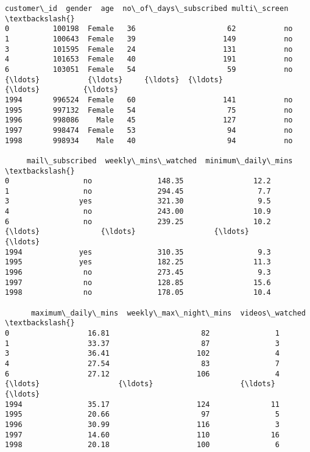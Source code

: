 \documentclass[11pt]{article}
\makeatletter
\newcommand{\boxspacing}{\kern\kvtcb@left@rule\kern\kvtcb@boxsep}
\newcommand{\prompt}[4]{
        {\ttfamily\llap{{\color{#2}[#3]:\hspace{3pt}#4}}\vspace{-\baselineskip}}
    }
\makeatother
\begin{document}
            \begin{tcolorbox}[breakable, size=fbox, boxrule=.5pt, pad at break*=1mm, opacityfill=0]
\prompt{Out}{outcolor}{52}{\boxspacing}
\begin{Verbatim}[commandchars=\\\{\}]
      customer\_id  gender  age  no\_of\_days\_subscribed multi\_screen  \textbackslash{}
0          100198  Female   36                     62           no
1          100643  Female   39                    149           no
3          101595  Female   24                    131           no
4          101653  Female   40                    191           no
6          103051  Female   54                     59           no
{\ldots}           {\ldots}     {\ldots}  {\ldots}                    {\ldots}          {\ldots}
1994       996524  Female   60                    141           no
1995       997132  Female   54                     75           no
1996       998086    Male   45                    127           no
1997       998474  Female   53                     94           no
1998       998934    Male   40                     94           no

     mail\_subscribed  weekly\_mins\_watched  minimum\_daily\_mins  \textbackslash{}
0                 no               148.35                12.2
1                 no               294.45                 7.7
3                yes               321.30                 9.5
4                 no               243.00                10.9
6                 no               239.25                10.2
{\ldots}              {\ldots}                  {\ldots}                 {\ldots}
1994             yes               310.35                 9.3
1995             yes               182.25                11.3
1996              no               273.45                 9.3
1997              no               128.85                15.6
1998              no               178.05                10.4

      maximum\_daily\_mins  weekly\_max\_night\_mins  videos\_watched  \textbackslash{}
0                  16.81                     82               1
1                  33.37                     87               3
3                  36.41                    102               4
4                  27.54                     83               7
6                  27.12                    106               4
{\ldots}                  {\ldots}                    {\ldots}             {\ldots}
1994               35.17                    124              11
1995               20.66                     97               5
1996               30.99                    116               3
1997               14.60                    110              16
1998               20.18                    100               6


\end{Verbatim}
\end{tcolorbox}
\end{document}

